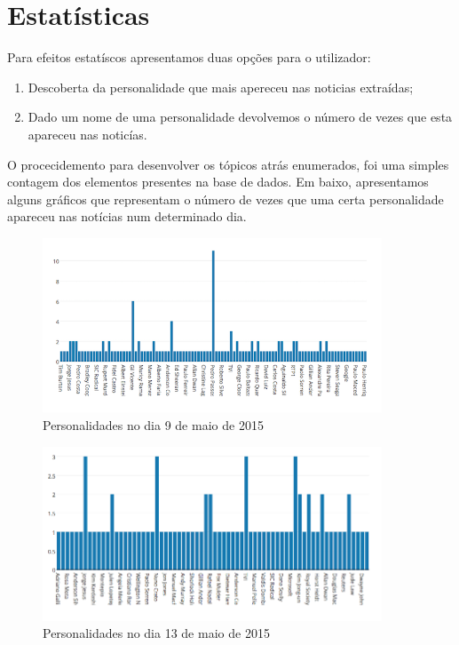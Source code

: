 \section{Estatísticas}

Para efeitos estatíscos apresentamos duas opções para o utilizador:

\begin{enumerate}
  \item Descoberta da personalidade que mais apereceu nas noticias extraídas;
  \item Dado um nome de uma personalidade devolvemos o número de vezes que esta apareceu nas noticías.
\end{enumerate}

O procecidemento para desenvolver os tópicos atrás enumerados, foi uma simples contagem dos elementos presentes na base de dados. Em baixo, apresentamos alguns gráficos que representam o número de vezes que uma certa personalidade apareceu nas notícias num determinado dia.

\begin{figure}[htbp]
  \centering
    \includegraphics[width=0.9\textwidth]{images/day_one.png}
	\caption{Personalidades no dia 9 de maio de 2015}
\end{figure}

\begin{figure}[htbp]
  \centering
    \includegraphics[width=0.9\textwidth]{images/day_two.png}
	\caption{Personalidades no dia 13 de maio de 2015}
\end{figure}

